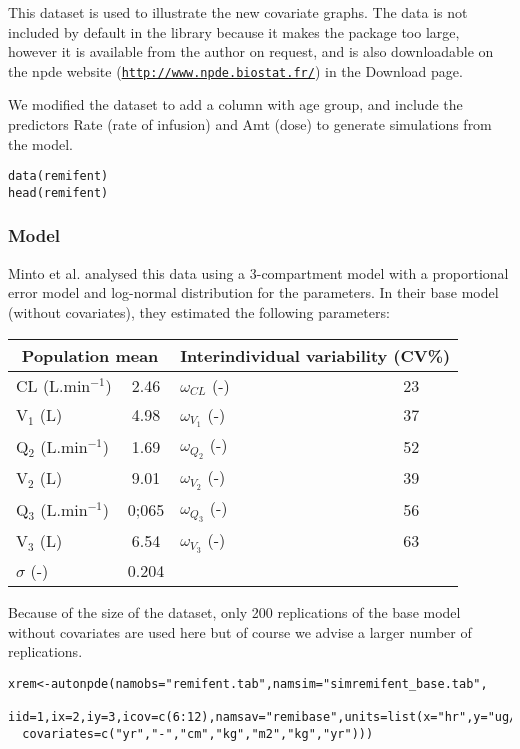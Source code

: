 This dataset is used to illustrate the new covariate graphs. The data is not included by default in the library because it makes the package too large, however it is available from the author on request, and is also downloadable on the npde website (\href{http://www.npde.biostat.fr/}{\texttt{http://www.npde.biostat.fr/}}) in the Download page.

We modified the dataset to add a column with age group, and include the predictors {\sf Rate} (rate of infusion) and {\sf Amt} (dose) to generate simulations from the model.
\begin{verbatim}
data(remifent)
head(remifent)
\end{verbatim} 

\subsubsection{Model}

\hskip 18pt Minto et al. analysed this data using a 3-compartment model with a proportional error model and log-normal distribution for the parameters. In their base model (without covariates), they estimated the following parameters:

\begin{center}
\begin{tabular} {l c | l c}
\hline 
\multicolumn{2}{c}{Population mean} & \multicolumn{2}{c}{Interindividual variability (CV\%)} \\
\hline 
CL (L.min$^{-1}$) & 2.46 & $\omega_{CL}$ (-) & 23 \\
V$_1$ (L) & 4.98 & $\omega_{V_1}$ (-) & 37 \\
Q$_2$ (L.min$^{-1}$) & 1.69 & $\omega_{Q_2}$ (-) & 52 \\
V$_2$ (L) & 9.01 & $\omega_{V_2}$ (-) & 39 \\
Q$_3$ (L.min$^{-1}$) & 0;065 & $\omega_{Q_3}$ (-) & 56 \\
V$_3$ (L) & 6.54 & $\omega_{V_3}$ (-) & 63 \\
$\sigma$ (-) & 0.204 \\
\hline
\end{tabular}
\end{center}

Because of the size of the dataset, only 200 replications of the base model without covariates are used here but of course we advise a larger number of replications.
\begin{verbatim}
xrem<-autonpde(namobs="remifent.tab",namsim="simremifent_base.tab",
  iid=1,ix=2,iy=3,icov=c(6:12),namsav="remibase",units=list(x="hr",y="ug/L",
  covariates=c("yr","-","cm","kg","m2","kg","yr")))
\end{verbatim}

